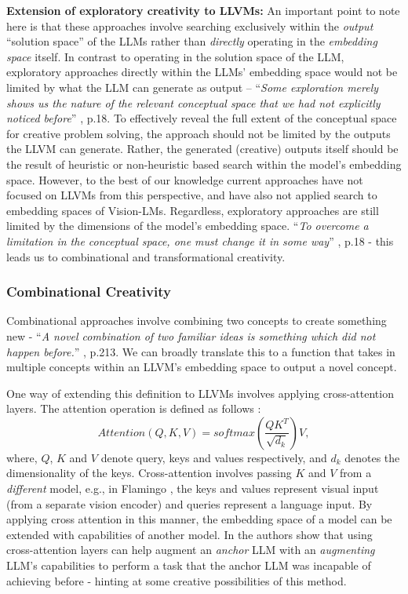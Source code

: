 \textbf{Extension of exploratory creativity to LLVMs:} An important point to note here is that these approaches involve searching exclusively within the \textit{output} ``solution space'' of the LLMs rather than \textit{directly} operating in the \textit{embedding space} itself. In contrast to operating in the solution space of the LLM, exploratory approaches directly within the LLMs' embedding space would not be limited by what the LLM can generate as output -- ``\textit{Some exploration merely shows us the nature of the relevant conceptual space that we had not explicitly noticed before}'' \cite{boden2005whatiscreativity}, p.18. To effectively reveal the full extent of the conceptual space for creative problem solving, the approach should not be limited by the outputs the LLVM can generate. Rather, the generated (creative) outputs itself should be the result of heuristic or non-heuristic based search within the model's embedding space. However, to the best of our knowledge current approaches have not focused on LLVMs from this perspective, and have also not applied search to embedding spaces of Vision-LMs. Regardless, exploratory approaches are still limited by the dimensions of the model's embedding space. ``\textit{To overcome a limitation in the conceptual space, one must change it in some way}'' \cite{boden2005whatiscreativity}, p.18 - this leads us to combinational and transformational creativity.

\subsubsection{Combinational Creativity}
Combinational approaches involve combining two concepts to create something new - ``\textit{A novel combination of two familiar ideas is something
which did not happen before.}'' \cite{boden1998creativity}, p.213. We can broadly translate this to a function that takes in multiple concepts within an LLVM's embedding space to output a novel concept.

One way of extending this definition to LLVMs involves applying cross-attention layers. The attention operation is defined as follows \cite{vaswani2017attention}:
\[Attention(Q, K, V) = softmax(\frac{QK^T}{\sqrt{d_k}})V,\]
where, $Q$, $K$ and $V$ denote query, keys and values respectively, and $d_k$ denotes the dimensionality of the keys. Cross-attention involves passing $K$ and $V$ from a \textit{different} model, e.g., in Flamingo \cite{alayrac2022flamingo}, the keys and values represent visual input (from a separate vision encoder) and queries represent a language input. By applying cross attention in this manner, the embedding space of a model can be extended with capabilities of another model. In \cite{bansal2024llm} the authors show that using cross-attention layers can help augment an \textit{anchor} LLM with an \textit{augmenting} LLM's capabilities to perform a task that the anchor LLM was incapable of achieving before - hinting at some creative possibilities of this method. 

